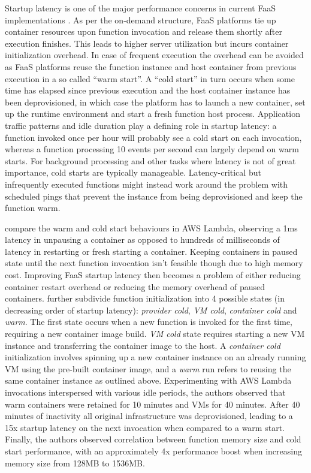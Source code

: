 Startup latency is one of the major performance concerns in current FaaS implementations \parencite{cncf18serverlessWG}. As per the on-demand structure, FaaS platforms tie up container resources upon function invocation and release them shortly after execution finishes. This leads to higher server utilization but incurs container initialization overhead. In case of frequent execution the overhead can be avoided as FaaS platforms reuse the function instance and host container from previous execution in a so called ``warm start''. A ``cold start'' in turn occurs when some time has elapsed since previous execution and the host container instance has been deprovisioned, in which case the platform has to launch a new container, set up the runtime environment and start a fresh function host process. Application traffic patterns and idle duration play a defining role in startup latency: a function invoked once per hour will probably see a cold start on each invocation, whereas a function processing 10 events per second can largely depend on warm starts. For background processing and other tasks where latency is not of great importance, cold starts are typically manageable. Latency-critical but infrequently executed functions might instead work around the problem with scheduled pings that prevent the instance from being deprovisioned and keep the function warm. \parencite{robert2016serverlessarchitectures}

\textcite{hendrickson16openlambda} compare the warm and cold start behaviours in AWS Lambda, observing a 1ms latency in unpausing a container as opposed to hundreds of milliseconds of latency in restarting or fresh starting a container. Keeping containers in paused state until the next function invocation isn't feasible though due to high memory cost. Improving FaaS startup latency then becomes a problem of either reducing container restart overhead or reducing the memory overhead of paused containers. \textcite{lloydserverless} further subdivide function initialization into 4 possible states (in decreasing order of startup latency): \textit{provider cold}, \textit{VM cold}, \textit{container cold} and \textit{warm}. The first state occurs when a new function is invoked for the first time, requiring a new container image build. \textit{VM cold} state requires starting a new VM instance and transferring the container image to the host. A \textit{container cold} initialization involves spinning up a new container instance on an already running VM using the pre-built container image, and a \textit{warm} run refers to reusing the same container instance as outlined above. Experimenting with AWS Lambda invocations interspersed with various idle periods, the authors observed that warm containers were retained for 10 minutes and VMs for 40 minutes. After 40 minutes of inactivity all original infrastructure was deprovisioned, leading to a 15x startup latency on the next invocation when compared to a warm start. Finally, the authors observed correlation between function memory size and cold start performance, with an approximately 4x performance boost when increasing memory size from 128MB to 1536MB.

